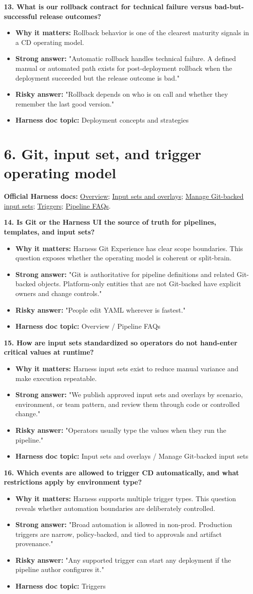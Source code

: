 \documentclass[11pt]{article}
\newcommand{\doccluster}[1]{%
  {\small\textcolor{AccentGray}{\textbf{Official Harness docs:} #1}}\par\vspace{0.4em}
}
\newcommand{\qblock}[5]{%
  \textbf{#1}\par
  \begin{itemize}[leftmargin=1.5em,itemsep=0.2em,topsep=0.3em]
    \item[--] \textbf{Why it matters:} #2
    \item[--] \textbf{Strong answer:} #3
    \item[--] \textbf{Risky answer:} #4
    \item[--] \textbf{Harness doc topic:} #5
  \end{itemize}
  \vspace{0.4em}
}
\begin{document}
\qblock{13. What is our rollback contract for technical failure versus bad-but-successful release outcomes?}{Rollback behavior is one of the clearest maturity signals in a CD operating model.}{"Automatic rollback handles technical failure. A defined manual or automated path exists for post-deployment rollback when the deployment succeeded but the release outcome is bad."}{"Rollback depends on who is on call and whether they remember the last good version."}{Deployment concepts and strategies}

\section*{6. Git, input set, and trigger operating model}
\doccluster{\href{https://developer.harness.io/docs/platform/get-started/overview/}{Overview}; \href{https://developer.harness.io/docs/platform/pipelines/input-sets}{Input sets and overlays}; \href{https://developer.harness.io/docs/platform/git-experience/manage-input-sets-in-simplified-git-experience}{Manage Git-backed input sets}; \href{https://developer.harness.io/docs/category/triggers/}{Triggers}; \href{https://developer.harness.io/docs/platform/pipeline-faq/}{Pipeline FAQs}.}

\qblock{14. Is Git or the Harness UI the source of truth for pipelines, templates, and input sets?}{Harness Git Experience has clear scope boundaries. This question exposes whether the operating model is coherent or split-brain.}{"Git is authoritative for pipeline definitions and related Git-backed objects. Platform-only entities that are not Git-backed have explicit owners and change controls."}{"People edit YAML wherever is fastest."}{Overview / Pipeline FAQs}

\qblock{15. How are input sets standardized so operators do not hand-enter critical values at runtime?}{Harness input sets exist to reduce manual variance and make execution repeatable.}{"We publish approved input sets and overlays by scenario, environment, or team pattern, and review them through code or controlled change."}{"Operators usually type the values when they run the pipeline."}{Input sets and overlays / Manage Git-backed input sets}

\qblock{16. Which events are allowed to trigger CD automatically, and what restrictions apply by environment type?}{Harness supports multiple trigger types. This question reveals whether automation boundaries are deliberately controlled.}{"Broad automation is allowed in non-prod. Production triggers are narrow, policy-backed, and tied to approvals and artifact provenance."}{"Any supported trigger can start any deployment if the pipeline author configures it."}{Triggers}
\end{document}
